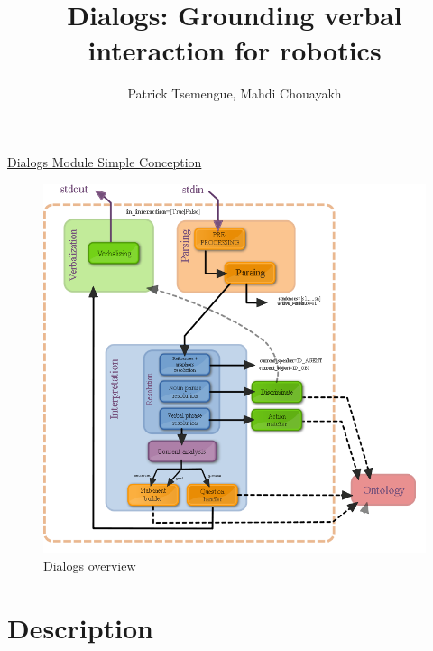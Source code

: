 \documentclass[twoside,a4paper,10pt]{report}
\title{ Dialogs: Grounding verbal interaction for robotics}
\author{Patrick Tsemengue, Mahdi Chouayakh}
\newcommand{\dokutitlelevelone}[1]{} %
\newcommand{\dokutitleleveltwo}[1]{\chapter{#1}}
\begin{document}
\sffamily
\allsectionsfont{\sffamily}

\thispagestyle{empty}
\maketitle
\thispagestyle{empty}
\cleardoublepage
\tableofcontents
\newpage
\thispagestyle{plain}
\cleardoublepage
\newpage



\dokutitlelevelone{Conception map}
\label{bc34ce150ff26ff0ec4b6be60dcf178c}%
\label{f0e926ab940662bebfe368ba24960a2d}%

\hyperref[d82c279ed6fd93ff2155ed19c4d2e7da]{Dialogs Module Simple Conception}

\begin{figure}[h]
\centering
\includegraphics[width=\linewidth]{dialog_module_simple.png}
\caption{Dialogs overview}
\end{figure}



\dokutitlelevelone{Data Structure}
\label{c8f6850ec2ec3fb32f203c1f4e3c2fd2}%

\dokutitleleveltwo{Description}
\label{67daf92c833c41c95db874e18fcb2786}%
\end{document}
